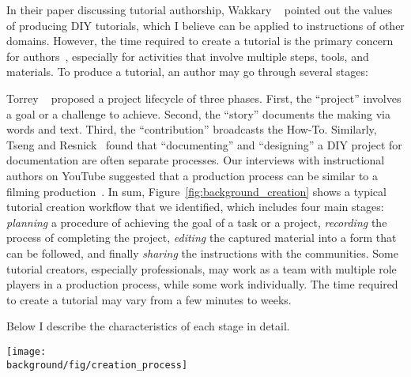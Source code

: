 In their paper discussing tutorial authorship, Wakkary \ea{}~\cite{Wakkary:2015:TAH:2702123.2702550} pointed out the values of producing DIY tutorials, which I believe can be applied to instructions of other domains. However, the time required to create a tutorial is the primary concern for authors~\cite{Kuznetsov:2010:REA:1868914.1868950,Tseng:2014:PVP:2598510.2598540}, especially for activities that involve multiple steps, tools, and materials. To produce a tutorial, an author may go through several stages:

Torrey \ea{}~\cite{Torrey:2007he} proposed a project lifecycle of three phases. First, the ``project'' involves a goal or a challenge to achieve. Second, the ``story'' documents the making via words and text. Third, the ``contribution'' broadcasts the How-To.
%
Similarly, Tseng and Resnick~\cite{Tseng:2014:PVP:2598510.2598540} found that ``documenting'' and ``designing'' a DIY project for documentation are often separate processes.
%
Our interviews with instructional authors on YouTube suggested that a production process can be similar to a filming production~\cite{Chi:2013:DGC:2501988.2502052,pincus2012the}.
%
In sum, Figure~\ref{fig:background_creation} shows a typical tutorial creation workflow that we identified, which includes four main stages: \emph{planning} a procedure of achieving the goal of a task or a project, \emph{recording} the process of completing the project, \emph{editing} the captured material into a form that can be followed, and finally \emph{sharing} the instructions with the communities.
%
Some tutorial creators, especially professionals, may work as a team with multiple role players in a production process, while some work individually. The time required to create a tutorial may vary from a few minutes to weeks.

Below I describe the characteristics of each stage in detail.

\begin{figure*}[h!]
  \centering
  \texttt{[image: \\background/fig/creation\_process]}
  \caption{A common workflow of tutorial creation, which includes planning the task in detail, recording the process, editing the captured content into a readable form, and sharing with the communities.}
  \label{fig:background_creation}
\end{figure*}


